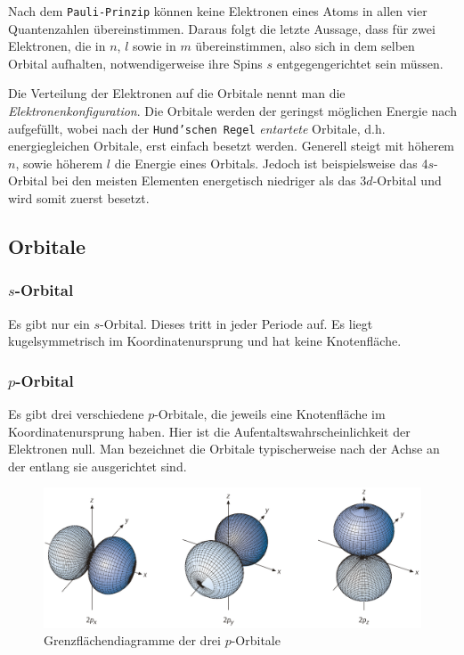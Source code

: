 \documentclass{scrartcl}
\begin{document}
	Nach dem \texttt{Pauli-Prinzip} können keine Elektronen eines Atoms in allen vier Quantenzahlen übereinstimmen. Daraus folgt die letzte Aussage, dass für zwei Elektronen, die in $n$, $l$ sowie in $m$ übereinstimmen, also sich in dem selben Orbital aufhalten, notwendigerweise ihre Spins $s$ entgegengerichtet sein müssen. 

	Die Verteilung der Elektronen auf die Orbitale nennt man die \emph{Elektronenkonfiguration}. Die Orbitale werden der geringst möglichen Energie nach aufgefüllt, wobei nach der \texttt{Hund'schen Regel} \emph{entartete} Orbitale, d.h. energiegleichen Orbitale, erst einfach besetzt werden. Generell steigt mit höherem $n$, sowie höherem $l$ die Energie eines Orbitals. Jedoch ist beispielsweise das 4$s$-Orbital bei den meisten Elementen energetisch niedriger als das 3$d$-Orbital und wird somit zuerst besetzt. 
\subsection{Orbitale}
\subsubsection{$s$-Orbital}
Es gibt nur ein $s$-Orbital. Dieses tritt in jeder Periode auf. Es liegt kugelsymmetrisch im Koordinatenursprung und hat keine Knotenfläche. 
\subsubsection{$p$-Orbital}
Es gibt drei verschiedene $p$-Orbitale, die jeweils eine Knotenfläche im Koordinatenursprung haben. Hier ist die Aufentaltswahrscheinlichkeit der Elektronen null. Man bezeichnet die Orbitale typischerweise nach der Achse an der entlang sie ausgerichtet sind.
\begin{figure}[h]
	\centering
	\caption{Grenzflächendiagramme der drei $p$-Orbitale\protect\footnotemark}
	\includegraphics[scale=.75]{p-Orbitale.png}
\end{figure}
\end{document}

